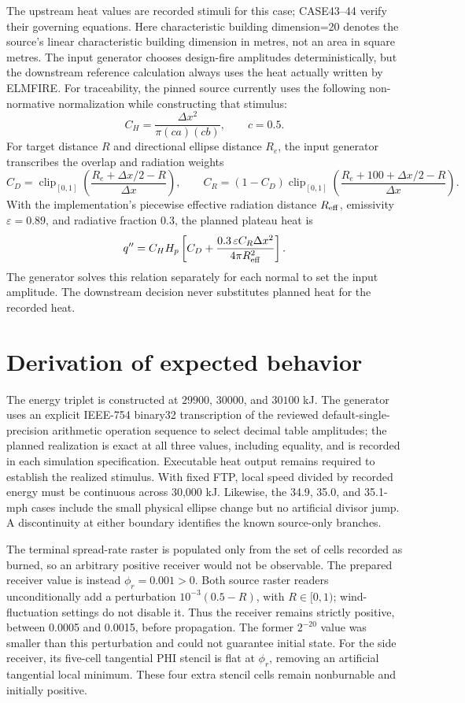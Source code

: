 The upstream heat values are recorded stimuli for this case; CASE43--44 verify
their governing equations. Here characteristic building dimension=20 denotes the source's
linear characteristic building dimension in metres, not an area in square
metres. The input generator chooses design-fire amplitudes deterministically,
but the downstream reference calculation always uses the heat actually written by ELMFIRE.
For traceability, the pinned source currently uses the following non-normative
normalization while constructing that stimulus:
\[
 C_H=\frac{\Delta x^2}{\pi(ca)(cb)},\qquad c=0.5.
\]
For target distance \(R\) and directional ellipse distance \(R_e\), the input
generator transcribes the overlap and radiation weights
\[
 C_D=\operatorname{clip}_{[0,1]}\left(\frac{R_e+\Delta x/2-R}{\Delta x}\right),
 \qquad
 C_R=(1-C_D)\operatorname{clip}_{[0,1]}\left(\frac{R_e+100+\Delta x/2-R}{\Delta x}\right).
\]
With the implementation's piecewise effective radiation distance
\(R_{\rm eff}\), emissivity \(\varepsilon=0.89\), and radiative fraction 0.3,
the planned plateau heat is
\[
 q''=C_H H_p\left[C_D+\frac{0.3\,\varepsilon C_R\Delta x^2}
 {4\pi R_{\rm eff}^2}\right].
\]
The generator solves this relation separately for each normal to set the input
amplitude.  The downstream decision never substitutes planned heat for the
recorded heat.

\section{Derivation of expected behavior}

The energy triplet is constructed at \(29900\), \(30000\), and \(30100\) kJ.
The generator uses an explicit IEEE-754 binary32 transcription of the reviewed
default-single-precision arithmetic operation sequence to select decimal table amplitudes;
the planned realization is exact at all three values, including equality, and
is recorded in each simulation specification. Executable heat output remains required
to establish the realized stimulus. With fixed FTP, local speed divided by
recorded energy must be continuous across 30,000 kJ. Likewise, the 34.9,
35.0, and 35.1-mph cases include the small physical ellipse change but no
artificial divisor jump. A discontinuity at either boundary identifies the
known source-only branches.

The terminal spread-rate raster is populated only from the set of cells recorded as burned,
so an arbitrary positive receiver would not be observable.  The prepared
receiver value is instead $\phi_r=0.001>0$. Both source raster readers
unconditionally add a perturbation $10^{-3}(0.5-R)$, with $R\in[0,1)$;
wind-fluctuation settings do not disable it. Thus the receiver remains
strictly positive, between 0.0005 and 0.0015, before propagation. The former
$2^{-20}$ value was smaller than this perturbation and could not guarantee
initial state. For the side receiver, its five-cell tangential PHI stencil is
flat at $\phi_r$, removing an artificial tangential local minimum. These
four extra stencil cells remain nonburnable and initially positive.


